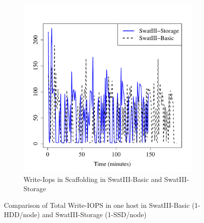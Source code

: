 \documentclass[conference]{IEEEtran}
\begin{document}
\begin{figure}[htb]
\begin{subfigure}[b]{0.3\textwidth}
                \includegraphics[width=\textwidth]{Figure/SystemData/Plots/SCFHddSsdWrIops.pdf}
                \caption{Write-Iops in Scaffolding in SwatIII-Basic and SwatIII-Storage}
                \label{fig:SCFHddSsdWrIops}
        \end{subfigure}
	\caption{Comparison of Total Write-IOPS in one host in SwatIII-Basic (1-HDD/node) and SwatIII-Storage (1-SSD/node)} \label{fig:HddSsdRWiops}
\end{figure}
\end{document}
